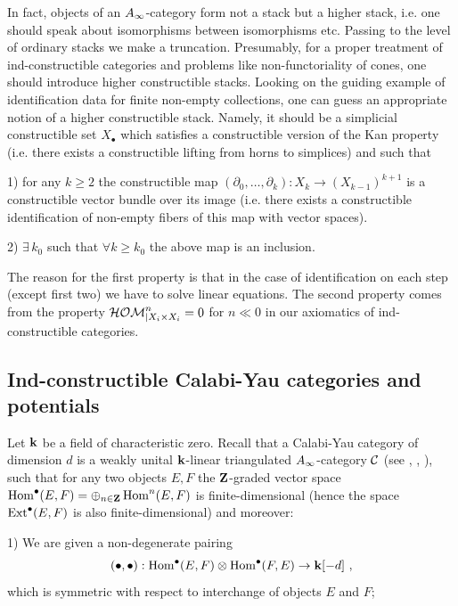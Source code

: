 \documentclass[12pt]{article}
\begin{document}
\begin{rmk} In fact, objects of an $A_{\infty}$-category form not a stack but a higher stack, i.e. one should speak about isomorphisms between isomorphisms etc.
Passing to the level of ordinary stacks we make a truncation. Presumably, for a proper treatment of ind-constructible categories
 and problems like non-functoriality of cones, one should introduce higher constructible stacks. Looking on the guiding example of 
 identification data for finite non-empty collections, one can guess  an appropriate notion of a higher constructible stack.
 Namely, it should be a simplicial constructible set $X_\bullet$ which satisfies a constructible version of the Kan property
(i.e. there exists a constructible lifting from horns to simplices) and such that 

1) for any $k\geqslant 2$ the constructible map $(\partial_0,\dots,\partial_k):X_k\to (X_{k-1})^{k+1}$ is a constructible vector bundle over its image 
(i.e. there exists a constructible identification of non-empty fibers of this map with vector spaces).

2)  $\exists \,k_0$ such that $\forall k\geqslant k_0$ the above map is an inclusion.

The reason for the first property is that in the case of identification on each step (except first two) we have to solve linear equations.
The second property comes from the property ${\cal HOM}^n_{|X_i\times X_i}=0$ for $n\ll 0$ in our axiomatics of ind-constructible categories.

\end{rmk}


\subsection{Ind-constructible Calabi-Yau categories and potentials}



Let ${\bf k}$ be a field of characteristic zero.
Recall that a  Calabi-Yau category of dimension $d$ is a weakly unital ${\bf k}$-linear triangulated $A_{\infty}$-category
${{\mathcal C}}$ (see \cite{KoSo2}, \cite{KoSo3}, \cite{So1}), such that for any two objects $E,F$ the ${\bf Z}$-graded vector space
$\operatorname{Hom}^\bullet(E,F)=\oplus_{n\in {\bf Z}}\operatorname{Hom}^n(E,F)$ is finite-dimensional
(hence the space $\operatorname{Ext}^\bullet(E,F)$ is also finite-dimensional)
and moreover:

1) We are given a  non-degenerate pairing 
$$(\bullet, \bullet): \operatorname{Hom}^{\bullet}(E,F)\otimes \operatorname{Hom}^{\bullet}(F,E)\to {\bf k}[-d]\,\,,$$
which is symmetric with respect to interchange of objects $E$ and $F$;
\end{document}
